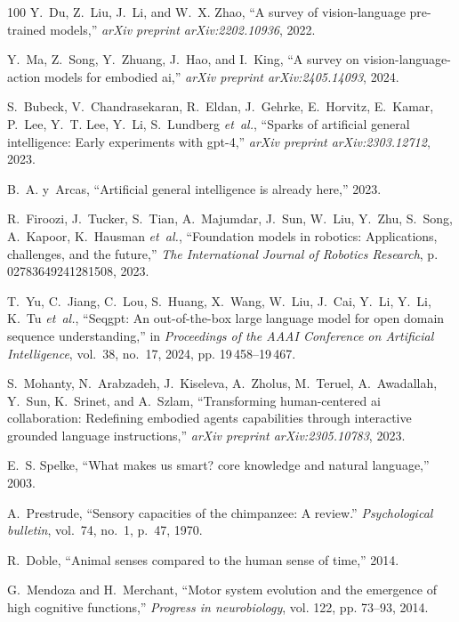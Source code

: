 \documentclass[10pt,journal,compsoc]{IEEEtran}
\begin{document}
\begin{thebibliography}{100}
	Y.~Du, Z.~Liu, J.~Li, and W.~X. Zhao, ``A survey of vision-language pre-trained
	models,'' \emph{arXiv preprint arXiv:2202.10936}, 2022.
	
	Y.~Ma, Z.~Song, Y.~Zhuang, J.~Hao, and I.~King, ``A survey on
	vision-language-action models for embodied ai,'' \emph{arXiv preprint
		arXiv:2405.14093}, 2024.
	
	S.~Bubeck, V.~Chandrasekaran, R.~Eldan, J.~Gehrke, E.~Horvitz, E.~Kamar,
	P.~Lee, Y.~T. Lee, Y.~Li, S.~Lundberg \emph{et~al.}, ``Sparks of artificial
	general intelligence: Early experiments with gpt-4,'' \emph{arXiv preprint
		arXiv:2303.12712}, 2023.
	
	B.~A. y~Arcas, ``Artificial general intelligence is already here,'' 2023.
	
	R.~Firoozi, J.~Tucker, S.~Tian, A.~Majumdar, J.~Sun, W.~Liu, Y.~Zhu, S.~Song,
	A.~Kapoor, K.~Hausman \emph{et~al.}, ``Foundation models in robotics:
	Applications, challenges, and the future,'' \emph{The International Journal
		of Robotics Research}, p. 02783649241281508, 2023.
	
	T.~Yu, C.~Jiang, C.~Lou, S.~Huang, X.~Wang, W.~Liu, J.~Cai, Y.~Li, Y.~Li, K.~Tu
	\emph{et~al.}, ``Seqgpt: An out-of-the-box large language model for open
	domain sequence understanding,'' in \emph{Proceedings of the AAAI Conference
		on Artificial Intelligence}, vol.~38, no.~17, 2024, pp. 19\,458--19\,467.
	
	S.~Mohanty, N.~Arabzadeh, J.~Kiseleva, A.~Zholus, M.~Teruel, A.~Awadallah,
	Y.~Sun, K.~Srinet, and A.~Szlam, ``Transforming human-centered ai
	collaboration: Redefining embodied agents capabilities through interactive
	grounded language instructions,'' \emph{arXiv preprint arXiv:2305.10783},
	2023.
	
	E.~S. Spelke, ``What makes us smart? core knowledge and natural language,''
	2003.
	
	A.~Prestrude, ``Sensory capacities of the chimpanzee: A review.''
	\emph{Psychological bulletin}, vol.~74, no.~1, p.~47, 1970.
	
	R.~Doble, ``Animal senses compared to the human sense of time,'' 2014.
	
	G.~Mendoza and H.~Merchant, ``Motor system evolution and the emergence of high
	cognitive functions,'' \emph{Progress in neurobiology}, vol. 122, pp. 73--93,
	2014.
	

\end{thebibliography}
\end{document}
